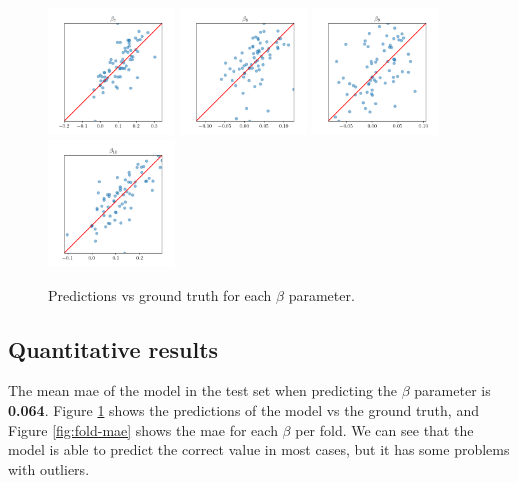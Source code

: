 \begin{figure}
    \includegraphics[width=0.3\textwidth]{files/predictions_beta/beta_7.png}
    \includegraphics[width=0.3\textwidth]{files/predictions_beta/beta_8.png}
    \includegraphics[width=0.3\textwidth]{files/predictions_beta/beta_9.png}
    \includegraphics[width=0.3\textwidth]{files/predictions_beta/beta_10.png}
    \caption{Predictions vs ground truth for each $\beta$ parameter.}
    \label{fig:scatter}
\end{figure}

\subsection{Quantitative results}

The mean \gls{mae} of the model in the test set when predicting the $\beta$
parameter is \textbf{0.064}. Figure \ref{fig:scatter} shows the predictions of
the model vs the ground truth, and Figure \ref{fig:fold-mae} shows the
\gls{mae} for each $\beta$ per fold. We can see that the model is able to
predict the correct value in most cases, but it has some problems with
outliers.

